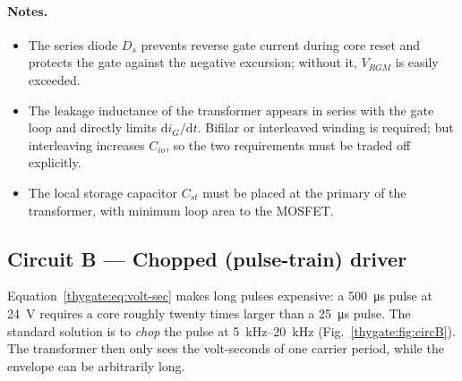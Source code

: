 \paragraph{Notes.}
\begin{itemize}
  \item The series diode $D_s$ prevents reverse gate current during core reset and
        protects the gate against the negative excursion; without it, $V_{RGM}$ is
        easily exceeded.
  \item The leakage inductance of the transformer appears in series with the gate
        loop and directly limits $\mathrm{d}i_G/\mathrm{d}t$. Bifilar or
        interleaved winding is required; but interleaving increases $C_{io}$, so
        the two requirements must be traded off explicitly.
  \item The local storage capacitor $C_{st}$ must be placed at the primary of the
        transformer, with minimum loop area to the MOSFET.
\end{itemize}

\subsection{Circuit B --- Chopped (pulse-train) driver}

Equation~\eqref{thygate:eq:volt-sec} makes long pulses expensive: a \SI{500}{\micro\second}
pulse at \SI{24}{\volt} requires a core roughly twenty times larger than a
\SI{25}{\micro\second} pulse. The standard solution is to \emph{chop} the pulse at
\SIrange{5}{20}{\kilo\hertz} (Fig.~\ref{thygate:fig:circB}). The transformer then only sees
the volt-seconds of one carrier period, while the envelope can be arbitrarily long.

